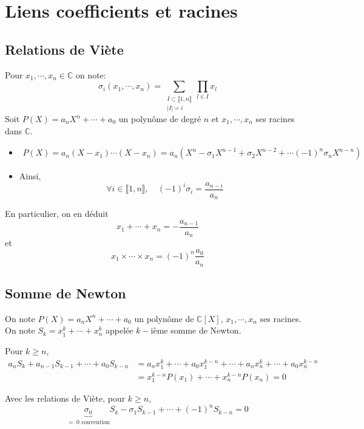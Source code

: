 \documentclass{article}
\theoremstyle{definition}
\begin{document}
\section{Liens coefficients et racines}

\subsection{Relations de Viète}

Pour $x_1, \cdots, x_n\in\mathbb C$ on note: \[
    \sigma_i(x_1, \cdots, x_n)=\sum_{\substack{I\subset \llbracket 1, n\rrbracket\\|I|=i}}\prod_{l\in I}x_l
\]
Soit $P(X)=a_nX^n+\cdots+a_0$ un polynôme de degré $n$ et $x_1, \cdots, x_n$ ses racines dans $\mathbb C$. \begin{itemize}
    \item \begin{align*}
            P(X)=a_n(X-x_1)\cdots (X-x_n)=a_n(X^n-\sigma_1 X^{n-1}+ \sigma_2 X^{n-2}+\cdots (-1)^n\sigma_nX^{n-n})
        \end{align*}
    \item Ainsi, \[
            \forall i\in\llbracket 1, n\rrbracket, \quad (-1)^i\sigma_i=\frac{a_{n-i}}{a_n}
        \]
\end{itemize}
En particulier, on en déduit \[
    x_1+\cdots+x_n = -\frac{a_{n-1}}{a_n}
\]
et \[
    x_1\times \cdots\times x_n=(-1)^n\frac{a_0}{a_n}
\]

\subsection{Somme de Newton}

On note $P(X)=a_nX^n+\cdots+a_0$ un polynôme de $\mathbb C[X]$, $x_1, \cdots, x_n$ ses racines. On note $S_k=x_1^k+\cdots + x_n^k$ appelée $k-$ième somme de Newton.

Pour $k\geq n$, \begin{align*}
    a_nS_k+a_{n-1}S_{k-1}+\cdots + a_0S_{k-n}&=a_nx_1^k+\cdots +a_0x_1^{k-n}+\cdots +a_nx_n^k+\cdots +a_0x_n^{k-n} \\ &=x_1^{k-n}P(x_1)+\cdots + x_n^{k-n}P(x_n)=0
\end{align*}

Avec les relations de Viète, pour $k\geq n$, \[
    \underbrace{\sigma_0}_{=\; 0 \text{ convention}} S_k-\sigma_1S_{k-1}+\cdots + (-1)^nS_{k-n}=0
\]
\end{document}
